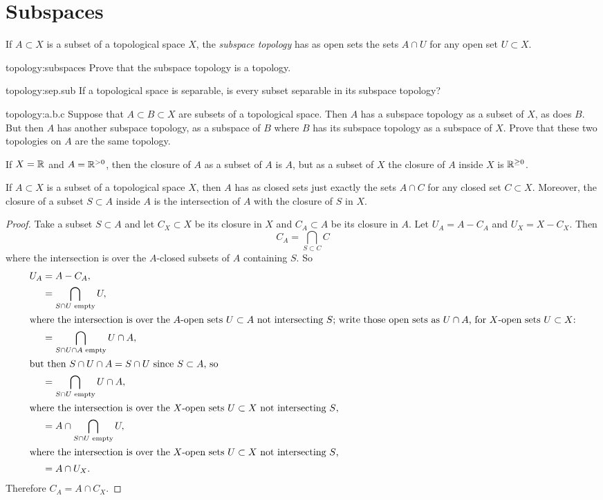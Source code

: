 \section{Subspaces}
If \(A \subset X\) is a subset of a topological space \(X\), the \emph{subspace topology} has as open sets the sets \(A \cap U\) for any open set \(U \subset X\).
\begin{problem}{topology:subspaces}
Prove that the subspace topology is a topology.
\end{problem}
\begin{problem*}{topology:sep.sub}
If a topological space is separable, is every subset separable in its subspace topology?
\end{problem*}
\begin{problem}{topology:a.b.c}
Suppose that \(A \subset B \subset X\) are subsets of a topological space.
Then \(A\) has a subspace topology as a subset of \(X\), as does \(B\).
But then \(A\) has another subspace topology, as a subspace of \(B\) where \(B\) has its subspace topology as a subspace of \(X\).
Prove that these two topologies on \(A\) are the same topology.
\end{problem}
\begin{example}
If \(X=\mathbb{R}^{}\) and \(A=\mathbb{R}^{> 0}\), then the closure of \(A\) as a subset of \(A\) is \(A\), but as a subset of \(X\) the closure of \(A\) inside \(X\) is \(\mathbb{R}^{\ge 0}\).
\end{example}
\begin{lemma}
If \(A \subset X\) is a subset of a topological space \(X\), then \(A\) has as closed sets just exactly the sets \(A \cap C\) for any closed set \(C \subset X\).
Moreover, the closure of a subset \(S \subset A\) inside \(A\) is the intersection of \(A\) with the closure of \(S\) in \(X\).
\end{lemma}
\begin{proof}
Take a subset \(S \subset A\) and let \(C_X \subset X\) be its closure in \(X\) and \(C_A \subset A\) be its closure in \(A\).
Let \(U_A = A - C_A\) and \(U_X = X - C_X\).
Then 
\[
C_A = \bigcap_{S \subset C} C
\]
where the intersection is over the \(A\)-closed subsets of \(A\) containing \(S\).
So
\begin{align*}
U_A 
&= 
A - C_A,
\\
&=
\bigcap_{S \cap U\text{ empty}} U,
\\
\intertext{where the intersection is over the \(A\)-open sets \(U \subset A\) not intersecting \(S\); write those open sets  as \(U \cap A\), for \(X\)-open sets \(U \subset X\):}
&=
\bigcap_{S \cap U \cap A\text{ empty}} U \cap A,
\\
\intertext{but then \(S \cap U \cap A=S \cap U\) since \(S \subset A\), so}
&=
\bigcap_{S \cap U\text{ empty}} U \cap A,
\\
\intertext{where the intersection is over the \(X\)-open sets \(U \subset X\) not intersecting \(S\),}
&=
A \cap \bigcap_{S \cap U\text{ empty}} U,
\\
\intertext{where the intersection is over the \(X\)-open sets \(U \subset X\) not intersecting \(S\),}
&=
A \cap U_X.
\end{align*}
Therefore \(C_A = A \cap C_X\).
\end{proof}
